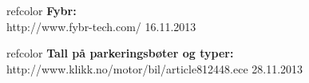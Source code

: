 \documentclass[xetex]{beamer}
\begin{document}
\begin{frame}
		\begin{beamercolorbox}[wd=1.0\textwidth, ht=2.8ex, dp=5pt, leftskip=.3cm, rightskip=.3cm]{refcolor}
    \tiny
    {\textbf{Fybr:}}\\
	 {http://www.fybr-tech.com/ \hfill 16.11.2013}
	\end{beamercolorbox}
	
	\begin{beamercolorbox}[wd=1.0\textwidth, ht=2.8ex, dp=5pt, leftskip=.3cm, rightskip=.3cm]{refcolor}
    \tiny
    {\textbf{Tall på parkeringsbøter og typer:}}\\
	 {http://www.klikk.no/motor/bil/article812448.ece \hfill 28.11.2013}
	\end{beamercolorbox}
	
\end{frame}
\end{document}
